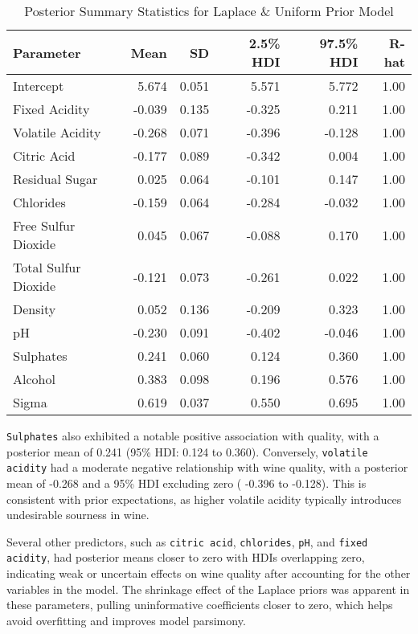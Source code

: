 \documentclass[12pt]{article}
\begin{document}
    \begin{table}[h]
    \centering
    \caption{Posterior Summary Statistics for Laplace \& Uniform Prior Model}
    \begin{tabular}{lrrrrr}
    \hline
    \textbf{Parameter} & \textbf{Mean} & \textbf{SD} & \textbf{2.5\% HDI} & \textbf{97.5\% HDI} & \textbf{R-hat} \\
    \hline
    Intercept             & 5.674  & 0.051 & 5.571  & 5.772  & 1.00 \\
    Fixed Acidity         & -0.039 & 0.135 & -0.325 & 0.211  & 1.00 \\
    Volatile Acidity      & -0.268 & 0.071 & -0.396 & -0.128 & 1.00 \\
    Citric Acid           & -0.177 & 0.089 & -0.342 & 0.004  & 1.00 \\
    Residual Sugar        & 0.025  & 0.064 & -0.101 & 0.147  & 1.00 \\
    Chlorides             & -0.159 & 0.064 & -0.284 & -0.032 & 1.00 \\
    Free Sulfur Dioxide   & 0.045  & 0.067 & -0.088 & 0.170  & 1.00 \\
    Total Sulfur Dioxide  & -0.121 & 0.073 & -0.261 & 0.022  & 1.00 \\
    Density               & 0.052  & 0.136 & -0.209 & 0.323  & 1.00 \\
    pH                    & -0.230 & 0.091 & -0.402 & -0.046 & 1.00 \\
    Sulphates             & 0.241  & 0.060 & 0.124  & 0.360  & 1.00 \\
    Alcohol               & 0.383  & 0.098 & 0.196  & 0.576  & 1.00 \\
    Sigma                 & 0.619  & 0.037 & 0.550  & 0.695  & 1.00 \\
    \hline
    \end{tabular}
    \label{tab:posterior_summary_laplace_uniform}
    \end{table}
    
    \texttt{Sulphates} also exhibited a notable positive association with quality, with a posterior mean of 0.241 (95\% HDI: 0.124 to 0.360). Conversely, \texttt{volatile acidity} had a moderate negative relationship with wine quality, with a posterior mean of -0.268 and a 95\% HDI excluding zero ( -0.396 to -0.128). This is consistent with prior expectations, as higher volatile acidity typically introduces undesirable sourness in wine.
    
    Several other predictors, such as \texttt{citric acid}, \texttt{chlorides}, \texttt{pH}, and \texttt{fixed acidity}, had posterior means closer to zero with HDIs overlapping zero, indicating weak or uncertain effects on wine quality after accounting for the other variables in the model. The shrinkage effect of the Laplace priors was apparent in these parameters, pulling uninformative coefficients closer to zero, which helps avoid overfitting and improves model parsimony.
\end{document}
